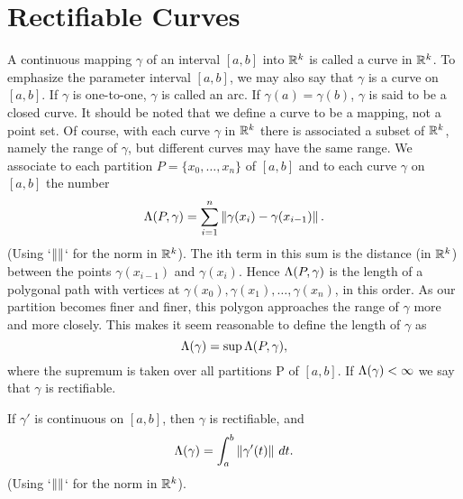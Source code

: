 \section{Rectifiable Curves}
\label{sec:chap6:rectifiable_curves}


\begin{definition} %
  \label{def:chap6:curve_arc_length}
  A continuous mapping $\gamma$ of an interval $[a, b]$ into $\mathbb{R}^k$
  is called a curve in $\mathbb{R}^k$. To emphasize the parameter interval
  $[a, b]$, we may also say that $\gamma$ is a curve on $[a, b]$.
  If $\gamma$ is one-to-one, $\gamma$ is called an arc.
  If $\gamma(a) = \gamma(b)$, $\gamma$ is said to be a closed curve.
  It should be noted that we define a curve to be a mapping, not a
  point set. Of course, with each curve $\gamma$ in $\mathbb{R}^k$ there is
  associated a subset of $\mathbb{R}^k$, namely the range of $\gamma$, but
  different curves may have the same range.
  We associate to each partition $P = \{x_0, \dots, x_n\}$ of $[a,
  b]$ and to each curve $\gamma$ on $[a, b]$ the number
  \[ \Lambda(P, \gamma) = \sum_{i=1}^n \left\lVert \gamma(x_i) -
  \gamma(x_{i-1}) \right\rVert. \]
  (Using `$\left\lVert  \right\rVert$` for the norm in $\mathbb{R}^k$).
  The ith term in this sum is the distance (in $\mathbb{R}^k$) between the
  points $\gamma(x_{i-1})$ and $\gamma(x_i)$. Hence $\Lambda(P,
  \gamma)$ is the length of a polygonal path with vertices at
  $\gamma(x_0), \gamma(x_1), \dots, \gamma(x_n)$, in this order. As
  our partition becomes finer and finer, this polygon approaches the
  range of $\gamma$ more and more closely. This makes it seem
  reasonable to define the length of $\gamma$ as
  \[ \Lambda(\gamma) = \sup \Lambda(P, \gamma), \]
  where the supremum is taken over all partitions P of $[a, b]$.
  If $\Lambda(\gamma) < \infty$ we say that $\gamma$ is rectifiable.
\end{definition}

\begin{theorem} %
  \label{thm:chap6:arc_length_formula}
  If $\gamma'$ is continuous on $[a, b]$, then $\gamma$ is rectifiable, and
  \[ \Lambda(\gamma) = \int_a^b \left\lVert \gamma'(t) \right\rVert \, dt. \]
  (Using `$\left\lVert  \right\rVert$` for the norm in $\mathbb{R}^k$).
\end{theorem}

